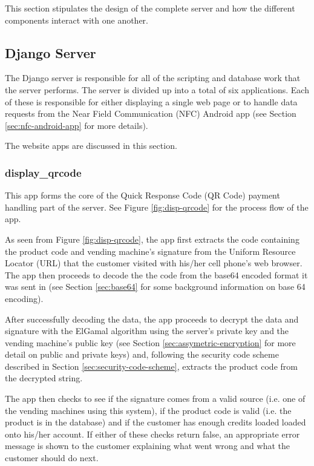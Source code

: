 This section stipulates the design of the complete server and how the different components
interact with one another. 

\subsection{Django Server}

The Django server is responsible for all of the scripting and database work that the server
performs. The server is divided up into a total of six applications. Each of these is
responsible for either displaying a single web page or to handle data requests from the
Near Field Communication (NFC) Android app (see Section \ref{sec:nfc-android-app} for more
details).

The website apps are discussed in this section.

\subsubsection{display\_qrcode}

This app forms the core of the Quick Response Code (QR Code) payment handling part of the
server. See Figure \ref{fig:disp-qrcode} for the process flow of the app.


As seen from Figure \ref{fig:disp-qrcode}, the app first extracts the code containing the
product code and vending machine's signature from the Uniform Resource Locator (URL) that the
customer visited with his/her cell phone's web browser. The app then proceeds to decode the
the code from the base64 encoded format it was sent in (see Section \ref{sec:base64} for some
background information on base 64 encoding).

After successfully decoding the data, the app proceeds to decrypt the data and signature with the ElGamal
algorithm using the server's private key and the vending machine's public key
(see Section \ref{sec:assymetric-encryption} for more detail on public and private keys) and, following the
security code scheme described in Section \ref{sec:security-code-scheme}, extracts the product
code from the decrypted string.

The app then checks to see if the signature comes from a valid source (i.e. one of the vending
machines using this system), if the product code is valid (i.e. the product is in the database)
and if the customer has enough credits loaded loaded onto his/her account. If either of these
checks return false, an appropriate error message is shown to the customer explaining what
went wrong and what the customer should do next.

